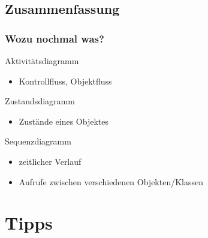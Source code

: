 \documentclass[18pt]{beamer}
\begin{document}
	\subsection{Zusammenfassung}
	\begin{frame}
		\frametitle{Wozu nochmal was?}
		\begin{block}{Aktivitätsdiagramm}
			\begin{itemize}
				\item Kontrollfluss, Objektfluss
			\end{itemize}
		\end{block}
	\pause
	\begin{block}{Zustandsdiagramm}
		\begin{itemize}
			\item Zustände eines Objektes
		\end{itemize}
	\end{block}
	\pause
	\begin{block}{Sequenzdiagramm}
		\begin{itemize}
			\item zeitlicher Verlauf
			\item Aufrufe zwischen verschiedenen Objekten/Klassen
		\end{itemize}
	\end{block}
\end{frame}

\section{Tipps}
\end{document}
